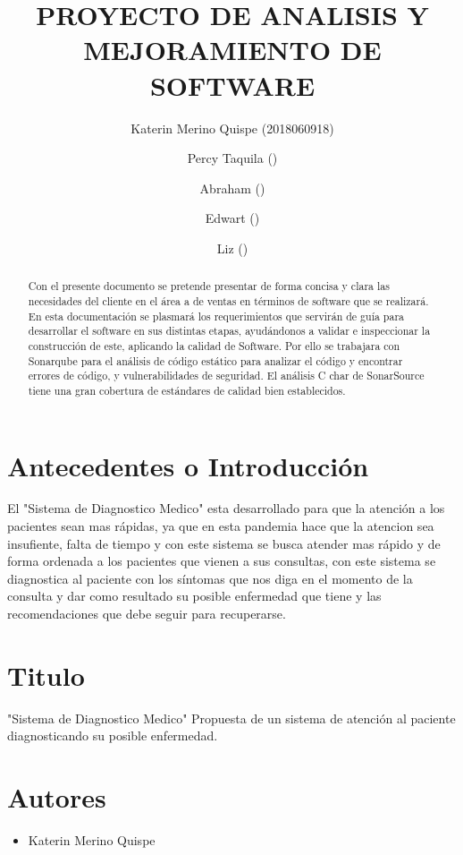 \documentclass[preprint,12pt]{elsarticle}
\begin{document}
	
	\begin{frontmatter}

		\title{\huge  PROYECTO DE  ANALISIS Y  MEJORAMIENTO DE  SOFTWARE }
		\author{Katerin Merino Quispe              (2018060918)}
		\author{Percy Taquila                ()}
		\author{Abraham                ()}
		\author{Edwart                ()}
		\author{Liz                ()}
		\address{Tacna, Perú}
		


\begin{abstract}
Con el presente documento se pretende presentar de forma concisa y clara las necesidades del cliente en el área a de ventas en términos de software que se realizará. 
En esta documentación se plasmará los requerimientos que servirán de guía para desarrollar el software en sus distintas etapas, ayudándonos a validar e inspeccionar la construcción de este, aplicando la calidad de Software.
Por ello se trabajara con  Sonarqube para el análisis de código estático
para analizar el código y encontrar errores de código, y vulnerabilidades de seguridad. 
El análisis C char de SonarSource tiene una gran cobertura de estándares de calidad bien establecidos.  
\end{abstract}


\end{frontmatter}
\section{Antecedentes o Introducción}

El "Sistema de Diagnostico Medico" esta desarrollado para que la atención a los pacientes sean mas rápidas, ya que en esta pandemia hace que la atencion sea insufiente, falta de tiempo y con este sistema se busca atender mas rápido y de forma ordenada a los pacientes que vienen a sus consultas, con este sistema se diagnostica al paciente con los síntomas que nos diga en el momento de la consulta y dar como resultado su posible enfermedad que tiene y las recomendaciones que debe seguir para recuperarse.

\section{Titulo}
"Sistema de Diagnostico Medico"
Propuesta de un sistema de atención al paciente diagnosticando su posible enfermedad.
\section{Autores}
\begin{itemize}
    \item Katerin Merino Quispe
    
\end{itemize}
\end{document}
